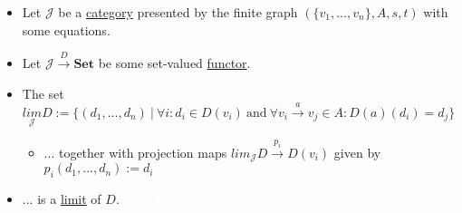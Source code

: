 \begin{itemize}
    \item Let $\mathcal{J}$ be a \href{doc/1 math/Seven Sketches in Compositionality/Chapter 3: Databases/2 Categories/1 Free Categories/1 Category}{category} presented by the finite graph $(\{v_1,...,v_n\},A,s,t)$ with some equations.
    \item Let $\mathcal{J}\xrightarrow{D}\mathbf{Set}$ be some set-valued \href{doc/1 math/Seven Sketches in Compositionality/Chapter 3: Databases/3 Functors, natural transformations, and databases/2 Functors/1 Functor}{functor}.
    \item The set $\underset{\mathcal{J}}{lim}D := \{(d_1,...,d_n)\ |\ \forall i: d_i \in D(v_i)\ \text{and}\ \forall v_i\xrightarrow{a}v_j \in A: D(a)(d_i)=d_j\}$
          \begin{itemize}\item ... together with projection maps $lim_\mathcal{J}D \xrightarrow{p_i}D(v_i)$ given by $p_i(d_1,...,d_n):=d_i$
          \end{itemize}
    \item ... is a \href{doc/1 math/Seven Sketches in Compositionality/Chapter 3: Databases/5 Introduction to limits and colimits/2 Limits/5 Limit}{limit} of $D$. \textcolor{white}{NOCARD}
  \end{itemize}